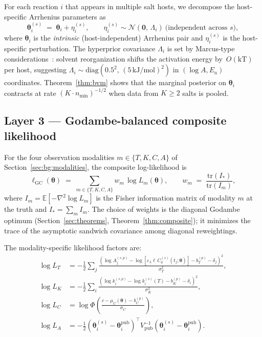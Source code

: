 \documentclass[12pt]{article}
\theoremstyle{plain}
\theoremstyle{definition}
\theoremstyle{remark}
\newcommand{\E}{\mathbb{E}}
\begin{document}
For each reaction $i$ that appears in multiple salt hosts, we decompose the
host-specific Arrhenius parameters as
%
\begin{equation}
  \boldsymbol\theta_i^{(s)} \;=\; \boldsymbol\theta_i + \eta_i^{(s)},
  \qquad \eta_i^{(s)} \sim \mathcal{N}(\mathbf{0},\,\Lambda_i)
  \ \text{(independent across $s$)},
  \label{eq:hierarchy}
\end{equation}
%
where $\boldsymbol\theta_i$ is the \emph{intrinsic} (host-independent)
Arrhenius pair and $\eta_i^{(s)}$ is the host-specific perturbation.  The
hyperprior covariance $\Lambda_i$ is set by Marcus-type
considerations~\citep{Marcus1965}: solvent reorganization shifts the
activation energy by~$O(\mathrm{kT})$ per host, suggesting
$\Lambda_i \sim \mathrm{diag}(0.5^2,\,(5\,\mathrm{kJ/mol})^2)$ in
$(\log A, E_a)$ coordinates.  Theorem~\ref{thm:bvm} shows that the marginal
posterior on $\boldsymbol\theta_i$ contracts at rate
$(K\cdot n_{\min})^{-1/2}$ when data from $K\ge 2$ salts is pooled.

\subsection{Layer 3 --- Godambe-balanced composite likelihood}\label{sec:framework:composite}

For the four observation modalities $m\in\{T,K,C,A\}$ of
Section~\ref{sec:bg:modalities}, the composite log-likelihood is
%
\begin{equation}
  \ell_{\mathrm{GC}}(\boldsymbol\theta)
  \;=\; \sum_{m\in\{T,K,C,A\}} w_m\,\log L_m(\boldsymbol\theta),
  \qquad w_m \;=\; \frac{\mathrm{tr}(I_*)}{\mathrm{tr}(I_m)},
  \label{eq:composite}
\end{equation}
%
where $I_m = \E[-\nabla^2\log L_m]$ is the Fisher information matrix of
modality $m$ at the truth and $I_* = \sum_m I_m$.  The choice of weights is
the diagonal Godambe optimum (Section~\ref{sec:theorems},
Theorem~\ref{thm:composite}); it minimizes the trace of the asymptotic
sandwich covariance among diagonal reweightings.

The modality-specific likelihood factors are:
%
\begin{align}
  \log L_T &= -\tfrac{1}{2}\sum_{j} \frac{(\log A^{(s,p)}_j - \log[\varepsilon_\lambda \ell\, C^{(s)}_q(t_j;\boldsymbol\theta)] - b^{(p)}_T - \delta_j)^2}{\sigma_T^2}, \label{eq:lik_T} \\
  \log L_K &= -\tfrac{1}{2}\sum_{i} \frac{(\log k^{(s,p)}_i - \log k_i^{(s)}(T) - b^{(p)}_K - \delta_i)^2}{\sigma_K^2}, \label{eq:lik_K} \\
  \log L_C &= \log\Phi\!\left(\frac{c - \mu_C(\boldsymbol\theta) - b^{(p)}_C}{\sigma_C}\right), \label{eq:lik_C} \\
  \log L_A &= -\tfrac{1}{2}(\boldsymbol\theta_i^{(s)} - \boldsymbol\theta_i^{\mathrm{pub}})^\top V_{\mathrm{pub}}^{-1}(\boldsymbol\theta_i^{(s)} - \boldsymbol\theta_i^{\mathrm{pub}}). \label{eq:lik_A}
\end{align}
\end{document}

